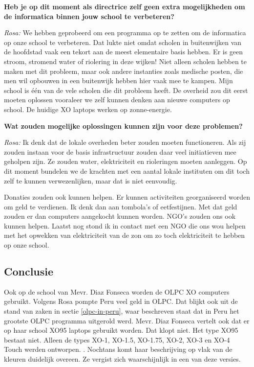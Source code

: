 \textbf{Heb je op dit moment als directrice zelf geen extra mogelijkheden om de informatica binnen jouw school te verbeteren?}

\textit{Rosa:} We hebben geprobeerd om een programma op te zetten om de informatica op onze school te verbeteren. Dat lukte niet omdat scholen in buitenwijken van de hoofdstad vaak een tekort aan de meest elementaire basis hebben. Er is geen stroom, stromend water of riolering in deze wijken! Niet alleen scholen hebben te maken met dit probleem, maar ook andere instanties zoals medische posten, die men wil opbouwen in een buitenwijk hebben hier vaak mee te kampen. Mijn school is één van de vele scholen die dit probleem heeft. De overheid zou dit eerst moeten oplossen vooraleer we zelf kunnen denken aan nieuwe computers op school. De huidige XO laptops werken op zonne-energie. 

\textbf{Wat zouden mogelijke oplossingen kunnen zijn voor deze problemen?}

\textit{Rosa:} Ik denk dat de lokale overheden beter zouden moeten functioneren. Als zij zouden instaan voor de basis infrastructuur zouden daar veel initiatieven mee geholpen zijn. Ze zouden water, elektriciteit en rioleringen moeten aanleggen. Op dit moment bundelen we de krachten met een aantal lokale instituten om dit toch zelf te kunnen verwezenlijken, maar dat is niet eenvoudig. 

Donaties zouden ook kunnen helpen. Er kunnen activiteiten georganiseerd worden om geld te verdienen. Ik denk dan aan tombola's of eetfestijnen. Met dat geld zouden er dan computers aangekocht kunnen worden. NGO's zouden ons ook kunnen helpen. Laatst nog stond ik in contact met een NGO die ons wou helpen met het opwekken van elektriciteit van de zon om zo toch elektriciteit te hebben op onze school.

\subsection{Conclusie}
Ook op de school van Mevr. Diaz Fonseca worden de OLPC XO computers gebruikt. Volgens Rosa pompte Peru veel geld in OLPC. Dat blijkt ook uit de stand van zaken in sectie \ref{olpc-in-peru}, waar beschreven staat dat in Peru het grootste OLPC programma uitgerold werd. Mevr. Diaz Fonseca vertelt ook dat er op haar school XO95 laptops gebruikt worden. Dat klopt niet. Het type XO95 bestaat niet. Alleen de types XO-1, XO-1.5, XO-1.75, XO-2, XO-3 en XO-4 Touch werden ontworpen. \autocite{OLPC2016}. Nochtans komt haar beschrijving op vlak van de kleuren duidelijk overeen. Ze vergist zich waarschijnlijk in een van deze versies.

